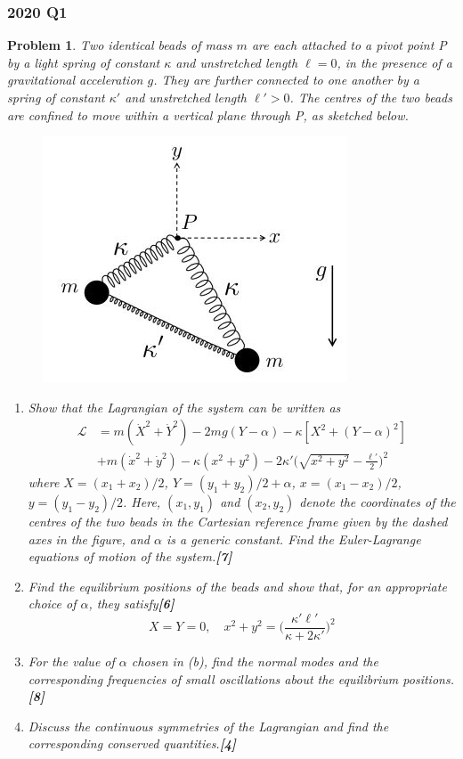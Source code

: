 \documentclass[a4paper]{article}
\theoremstyle{new}
\newtheorem{qns}{Problem}[section]
\begin{document}
\subsubsection*{2020 Q1}
\begin{qns}
Two identical beads of mass $m$ are each attached to a pivot point P by a light spring of constant $\kappa$ and unstretched length $\ell= 0$, in the presence of a gravitational acceleration $g$. They are further connected to one another by a spring of constant $\kappa'$ and unstretched length $\ell'>0$. The centres of the two beads are confined to move within a vertical plane through P, as sketched below.
\begin{figure}[H]
    \centering
    \includegraphics[scale=0.65]{2020TP1Q1.JPG}
\end{figure}
\begin{enumerate}[label=(\alph*)]
\item Show that the Lagrangian of the system can be written as
\begin{align}
\mathcal{L}&=m(\dot{X}^2+\dot{Y}^2)-2mg(Y-\alpha)-\kappa[X^2+(Y-\alpha)^2]\nonumber\\&+m(\dot{x}^2+\dot{y}^2)-\kappa(x^2+y^2)-2\kappa'\bigg(\sqrt{x^2+y^2}-\frac{\ell'}{2}\bigg)^2\nonumber
\end{align}
where $X = (x_1 + x_2)/2$, $Y = (y_1 + y_2)/2 + \alpha$, $x = (x_1 − x_2)/2$, $y = (y_1 − y_2)/2$. Here, $(x_1, y_1)$ and $(x_2, y_2)$ denote the coordinates of the centres of the two beads in the Cartesian reference frame given by the dashed axes in the figure, and $\alpha$ is a generic constant. Find the Euler-Lagrange equations of motion of the system.\hfill\textbf{[7]}
\item Find the equilibrium positions of the beads and show that, for an appropriate choice of $\alpha$, they satisfy\hfill\textbf{[6]}
$$X=Y=0,\quad x^2+y^2=\bigg(\frac{\kappa'\ell'}{\kappa+2\kappa'}\bigg)^2$$
\item For the value of $\alpha$ chosen in (b), find the normal modes and the corresponding frequencies of small oscillations about the equilibrium positions.\hfill\textbf{[8]}
\item Discuss the continuous symmetries of the Lagrangian and find the corresponding conserved quantities.\hfill\textbf{[4]}
\end{enumerate}
\end{qns}
\end{document}
